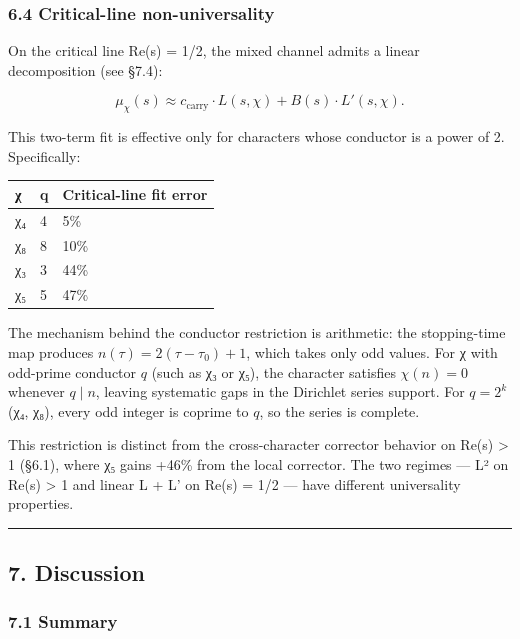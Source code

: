 \documentclass[
  11pt,
]{article}
\begin{document}
\subsubsection{6.4 Critical-line
non-universality}\label{critical-line-non-universality}

On the critical line Re(s) = 1/2, the mixed channel admits a linear
decomposition (see §7.4):

\[\mu_{\chi}(s) \approx c_{\mathrm{carry}} \cdot L(s, \chi) + B(s) \cdot L'(s, \chi).\]

This two-term fit is effective only for characters whose conductor is a power of
2. Specifically:

\begin{longtable}[]{@{}lll@{}}
\toprule\noalign{}
χ & q & Critical-line fit error \\
\midrule\noalign{}
\endhead
\bottomrule\noalign{}
\endlastfoot
χ₄ & 4 & 5\% \\
χ₈ & 8 & 10\% \\
χ₃ & 3 & 44\% \\
χ₅ & 5 & 47\% \\
\end{longtable}

The mechanism behind the conductor restriction is arithmetic: the stopping-time
map produces \(n(\tau) = 2(\tau - \tau_0) + 1\), which takes only odd values.
For χ with odd-prime conductor \(q\) (such as χ₃ or χ₅), the character satisfies
\(\chi(n) = 0\) whenever \(q \mid n\), leaving systematic gaps in the Dirichlet
series support. For \(q = 2^k\) (χ₄, χ₈), every odd integer is coprime to \(q\),
so the series is complete.

This restriction is distinct from the cross-character corrector behavior on
Re(s) \textgreater{} 1 (§6.1), where χ₅ gains +46\% from the local corrector.
The two regimes --- L² on Re(s) \textgreater{} 1 and linear L + L' on Re(s) =
1/2 --- have different universality properties.

\begin{center}\rule{0.5\linewidth}{0.5pt}\end{center}

\newpage

\subsection{7. Discussion}\label{discussion}

\subsubsection{7.1 Summary}\label{summary}
\end{document}
